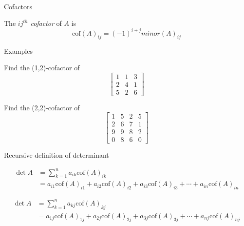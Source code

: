 \documentclass{beamer}
\begin{document}
\begin{frame}{Cofactors}
    \begin{definition}
    The \emph{$ij^{th}$ cofactor} of $A$ is
    \begin{equation*}
      \mbox{cof}(A)_{ij}=(-1)^{i+j} minor \left(A\right)_{ij}
    \end{equation*}
  \end{definition}
\end{frame}

\begin{frame}{Examples}
  \begin{example}
    Find the (1,2)-cofactor of
    \begin{equation*}
      \left[
	\begin{array}{ccc}
          1&1&3\\
          2&4&1\\
          5&2&6
	\end{array}
      \right]
    \end{equation*}
  \end{example}
  \begin{example}
    Find the (2,2)-cofactor of
    \begin{equation*}
      \left[
	\begin{array}{cccc}
          1&5&2&5\\
          2&6&7&1\\
          9&9&8&2\\
          0&8&6&0
	\end{array}
      \right]
    \end{equation*}
  \end{example}
\end{frame}

\begin{frame}{Recursive definition of determinant}
  \begin{definition}
    \begin{align*}
      \det A &= \sum_{k=1}^n a_{ik}\mbox{cof}(A)_{ik}\\
             &=a_{i1} \mbox{cof}(A)_{i1} + a_{i2}\mbox{cof}(A)_{i2} +
      a_{i3}\mbox{cof}(A)_{i3} + \cdots + a_{in}\mbox{cof}(A)_{in}
    \end{align*}
  \end{definition}
  \begin{definition}
    \begin{align*}
      \det A &= \sum_{k=1}^n a_{kj}\mbox{cof}(A)_{kj}\\
             &=a_{1j} \mbox{cof}(A)_{1j} + a_{2j}\mbox{cof}(A)_{2j} +
      a_{3j}\mbox{cof}(A)_{3j} + \cdots + a_{nj}\mbox{cof}(A)_{nj}
    \end{align*}
  \end{definition}
\end{frame}
\end{document}

